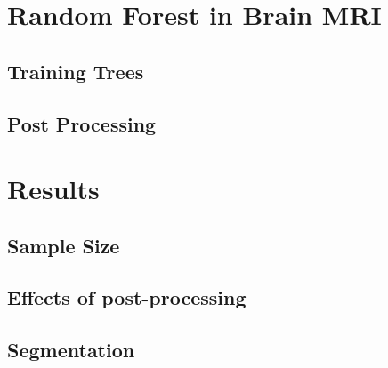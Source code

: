 \documentclass{article}
\begin{document}
 \section{Random Forest in Brain MRI}
 \subsection{Training Trees}
 \subsection{Post Processing}

 \section{Results}
 \subsection{Sample Size}
 \subsection{Effects of post-processing}
 \subsection{Segmentation}


 
\end{document}
